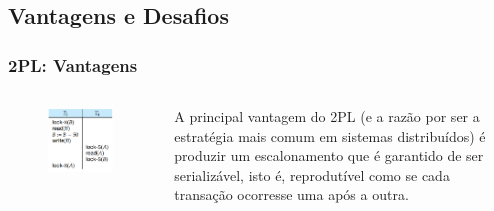 \documentclass{beamer}
\begin{document}

\subsection{Vantagens e Desafios}

\begin{frame} %
    \frametitle{2PL: Vantagens}

    \begin{columns}[c] %
    
            \begin{figure}
                \includegraphics[width=0.8\linewidth]{example6.png}
            \end{figure}
        
        
        A principal vantagem do 2PL (e a razão por ser a estratégia mais comum em sistemas distribuídos) é produzir um escalonamento que é garantido de ser serializável, isto é, reprodutível como se cada transação ocorresse uma após a outra.
    \end{columns}
    
\end{frame}


\end{document}
